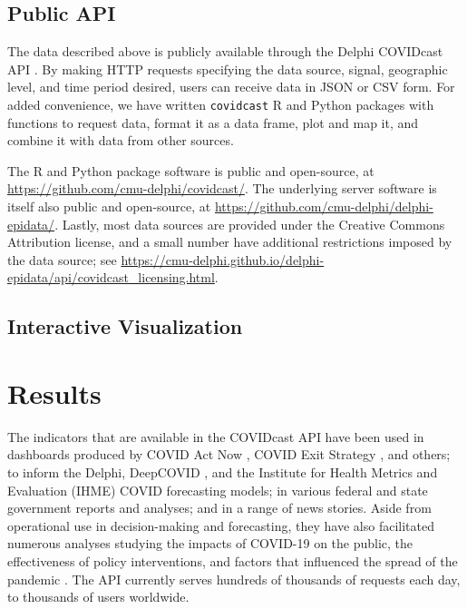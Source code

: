 \documentclass[9pt,twocolumn,twoside,lineno]{pnas-new}
\begin{document}
\subsection{Public API}

The data described above is publicly available through the Delphi COVIDcast API
\cite{CovidcastAPI}.  By making HTTP requests specifying the data source,
signal, geographic level, and time period desired, users can receive data in
JSON or CSV form. For added convenience, we have written \texttt{covidcast} R
\cite{CovidcastR} and Python \cite{CovidcastPy} packages with functions to
request data, format it as a data frame, plot and map it, and combine it with
data from other sources.

The R and Python package software is public and open-source, at
\url{https://github.com/cmu-delphi/covidcast/}.  The underlying server software
is itself also public and open-source, at
\url{https://github.com/cmu-delphi/delphi-epidata/}.  Lastly, most data sources
are provided under the Creative Commons Attribution license, and a small number
have additional restrictions imposed by the data source; see
\url{https://cmu-delphi.github.io/delphi-epidata/api/covidcast_licensing.html}.

\subsection{Interactive Visualization}



\section{Results}

The indicators that are available in the COVIDcast API have been used in
dashboards produced by COVID Act Now \cite{CovidActNow}, COVID Exit Strategy
\cite{CovidExitStrategy}, and others; to inform the Delphi, DeepCOVID
\cite{Rodriguez:2021}, and the Institute for Health Metrics and Evaluation
(IHME) \cite{IHMEProj} COVID forecasting models; in various federal and state
government reports and analyses; and in a range of news stories. Aside from
operational use in decision-making and forecasting, they have also facilitated
numerous analyses studying the impacts of COVID-19 on the public, the
effectiveness of policy interventions, and factors that influenced the spread of
the pandemic \cite{Adjodah:2021, Pierri:2021, Jewell:2021, Chakrabarti:2020,
  Doerr:2021}. The API currently serves hundreds of thousands of requests each
day, to thousands of users worldwide.
\end{document}
